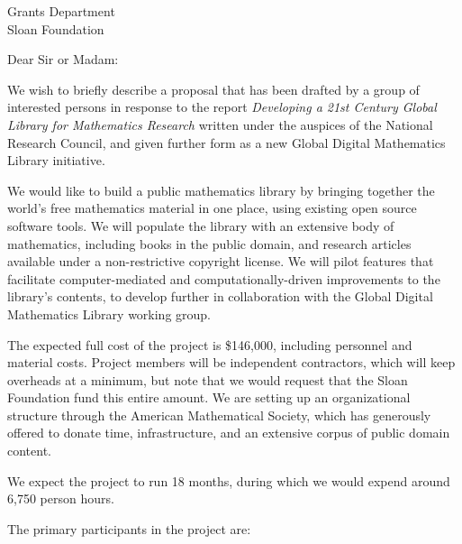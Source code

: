 \documentclass{letter}
\begin{document}
\signature{Volker Sorge}
\address{Volker Sorge\\
School of Computer Science\\
University of Birmingham\\
B15 2TT, UK}
\begin{letter}{Grants Department \\ Sloan Foundation}
\opening{Dear Sir or Madam:}


We wish to briefly describe a proposal that has been drafted by a
group of interested persons in response to the report \emph{Developing
  a 21st Century Global Library for Mathematics Research} written
under the auspices of the National Research Council, and given further
form as a new Global Digital Mathematics Library initiative.

We would like to build a public mathematics library by bringing
together the world's free mathematics material in one place, using
existing open source software tools.
%
We will populate the library with an extensive body of mathematics,
including books in the public domain, and research articles available
under a non-restrictive copyright license.
%
We will pilot features that facilitate computer-mediated and
computationally-driven improvements to the library's contents, to
develop further in collaboration with the Global Digital Mathematics
Library working group.

The expected full cost of the project is \$146,000, including
personnel and material costs.  Project members will be independent
contractors, which will keep overheads at a minimum, but note that we
would request that the Sloan Foundation fund this entire amount.  We
are setting up an organizational structure through the American
Mathematical Society, which has generously offered to donate time,
infrastructure, and an extensive corpus of public domain content.

We expect the project to run 18 months, during which we would expend
around 6,750 person hours.

The primary participants in the project are:


\end{letter}
\end{document}
